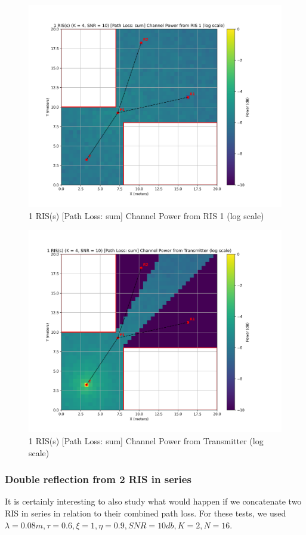 \begin{figure}[H]
  \centering
  \includegraphics[width=0.7\linewidth]{imgs/heatmap-simulations/1 RIS(s) (K = 4, SNR = 10) [Path Loss_ sum] Channel Power from RIS 1 (log scale).png}
  \caption{1 RIS(s) [Path Loss: sum] Channel Power from RIS 1 (log scale)}
\end{figure}

\begin{figure}[H]
  \centering
  \includegraphics[width=0.7\linewidth]{imgs/heatmap-simulations/1 RIS(s) (K = 4, SNR = 10) [Path Loss_ sum] Channel Power from Transmitter (log scale).png}
  \caption{1 RIS(s) [Path Loss: sum] Channel Power from Transmitter (log scale)}
\end{figure}

\subsubsection{Double reflection from 2 RIS in series}

It is certainly interesting to also study what would happen if we concatenate two RIS in series in relation to their combined path loss. For these tests, we used $\lambda = 0.08m, \tau = 0.6, \xi = 1, \eta = 0.9, SNR = 10db, K = 2, N = 16$.

